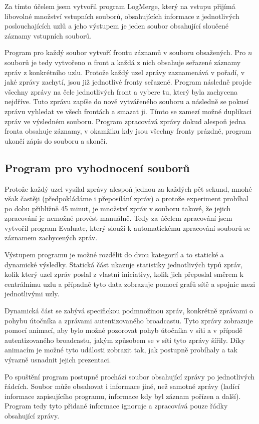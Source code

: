 \documentclass[11pt,final,twoside]{fithesis2}
\begin{document}
Za tímto účelem jsem vytvořil program LogMerge, který na vstupu přijímá libovolné množství vstupních souborů, obsahujících informace z 
jednotlivých poslouchajících uzlů a jeho výstupem je jeden soubor obsahující sloučené záznamy vstupních souborů. 

Program pro každý soubor vytvoří frontu záznamů v souboru obsažených. Pro $n$ souborů je tedy vytvořeno $n$ front a každá z nich obsahuje 
seřazené záznamy zpráv z konkrétního uzlu. Protože každý uzel zprávy zaznamenává v pořadí, v jaké zprávy zachytí, jsou již jednotlivé 
fronty seřazené. Program následně projde všechny zprávy na čele jednotlivých front a vybere tu, který byla zachycena nejdříve. Tuto 
zprávu zapíše do nově vytvářeného souboru a následně se pokusí zprávu vyhledat ve všech frontách a smazat ji. Tímto se zamezí možné 
duplikaci zpráv ve výsledném souboru. Program zpracovává zprávy dokud alespoň jedna fronta obsahuje záznamy, v okamžiku kdy jsou všechny 
fronty prázdné, program ukončí zápis do souboru a skončí. 

\subsection{Program pro vyhodnocení souborů}
Protože každý uzel vysílal zprávy alespoň jednou za každých pět sekund, mnohé však častěji (předpokládáme i přeposílání zpráv) a protože experiment probíhal po dobu 
přibližně 45 minut, je množství zpráv v souboru takové, že jejich zpracování je nemožné provést manuálně. Tedy za účelem zpracování 
jsem vytvořil program Evaluate, který slouží k automatickému zpracování souborů se záznamem zachycených zpráv. 

Výstupem programu je možné rozdělit do dvou kategorií a to statické a dynamické výsledky. Statická část ukazuje statistiky jednotlivých 
typů zpráv, kolik který uzel zpráv poslal z vlastní iniciativy, kolik jich přeposlal směrem k centrálnímu uzlu a případně tyto data 
zobrazuje pomocí grafů sítě a spojnic mezi jednotlivými uzly. 

Dynamická část se zabývá specifickou podmnožinou zpráv, konkrétně zprávami o pohybu útočníka a zprávami autentizovaného broadcastu. 
Tyto zprávy zobrazuje pomocí animací, aby bylo možné pozorovat pohyb útočníka v síti a v případě autentizovaného broadcastu, jakým 
způsobem se v síti tyto zprávy šířily. Díky animacím je možné tyto události zobrazit tak, jak postupně probíhaly a tak výrazně usnadnit 
jejich prezentaci. 

Po spuštění program postupně prochází soubor obsahující zprávy po jednotlivých řádcích. Soubor může obsahovat i informace jiné, než 
samotné zprávy (ladící informace zapisujícího programu, informace kdy byl záznam pořízen a další). Program tedy tyto přidané informace
ignoruje a zpracovává pouze řádky obsahující zprávy.
\end{document}

